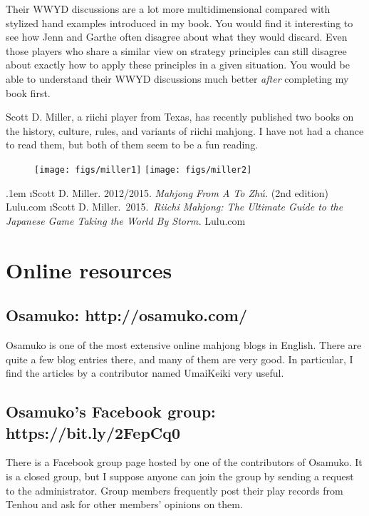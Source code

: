 \bigskip
Their WWYD discussions are a lot more multidimensional compared with stylized hand examples introduced in my book. You would find it interesting to see how Jenn and Garthe often disagree about what they would discard. Even those players who share a similar view on strategy principles can still disagree about exactly how to apply these principles in a given situation. 
You would be able to understand their WWYD discussions much better \emph{after} completing my book first. 

\bigskip
Scott D. Miller, a riichi player from Texas, has recently published two books on the history, culture, rules, and variants of riichi mahjong. I have not had a chance to read them, but both of them seem to be a fun reading. 

\vspace{-2pt}
\begin{figure}[h]\centering
\texttt{[image: figs/miller1]}
\texttt{[image: figs/miller2]}
\end{figure}
\vspace{-15pt}
\be\itemsep.1em \setcounter{enumi}{5}
\i Scott D. Miller. 2012/2015. \textit{Mahjong From A To Zh\'{u}.} (2nd edition) Lulu.com
\i Scott D. Miller.~2015.~\textit{Riichi Mahjong: The Ultimate Guide to the Japanese Game Taking the World By Storm.} Lulu.com
\ee


\newpage
\section{Online resources}

\subsection*{Osamuko: \textbf{http://osamuko.com/}} 
Osamuko is one of the most extensive online mahjong blogs in English. There are quite a few blog entries there, and many of them are very good. In particular, I find the articles by a contributor named UmaiKeiki very useful. 

\subsection*{Osamuko's Facebook group: \textbf{https://bit.ly/2FepCq0}}
There is a Facebook group page hosted by one of the contributors of Osamuko. It is a closed group, but I suppose anyone can join the group by sending a request to the administrator. Group members frequently post their play records from {\jap Tenhou} and ask for other members' opinions on them. 

